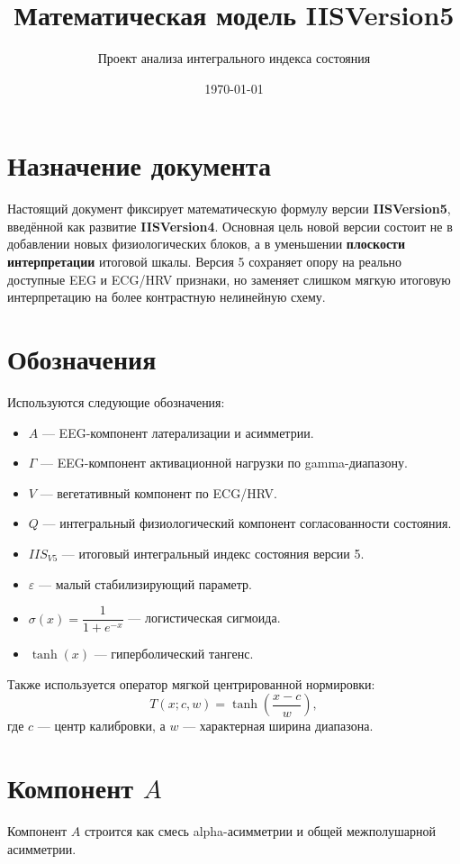 \documentclass[12pt,a4paper]{article}
\title{Математическая модель IISVersion5}
\author{Проект анализа интегрального индекса состояния}
\date{\today}
\begin{document}
\maketitle

\section{Назначение документа}
Настоящий документ фиксирует математическую формулу версии \textbf{IISVersion5}, введённой как развитие \textbf{IISVersion4}. Основная цель новой версии состоит не в добавлении новых физиологических блоков, а в уменьшении \textbf{плоскости интерпретации} итоговой шкалы. Версия 5 сохраняет опору на реально доступные EEG и ECG/HRV признаки, но заменяет слишком мягкую итоговую интерпретацию на более контрастную нелинейную схему.

\section{Обозначения}
Используются следующие обозначения:
\begin{itemize}[leftmargin=1.25cm]
    \item $A$ --- EEG-компонент латерализации и асимметрии.
    \item $\Gamma$ --- EEG-компонент активационной нагрузки по gamma-диапазону.
    \item $V$ --- вегетативный компонент по ECG/HRV.
    \item $Q$ --- интегральный физиологический компонент согласованности состояния.
    \item $IIS_{V5}$ --- итоговый интегральный индекс состояния версии 5.
    \item $\varepsilon$ --- малый стабилизирующий параметр.
    \item $\sigma(x)=\dfrac{1}{1+e^{-x}}$ --- логистическая сигмоида.
    \item $\tanh(x)$ --- гиперболический тангенс.
\end{itemize}

Также используется оператор мягкой центрированной нормировки:
\begin{equation}
T(x;c,w)=\tanh\!\left(\frac{x-c}{w}\right),
\end{equation}
где $c$ --- центр калибровки, а $w$ --- характерная ширина диапазона.

\section{Компонент \(A\)}
Компонент $A$ строится как смесь alpha-асимметрии и общей межполушарной асимметрии.
\end{document}
